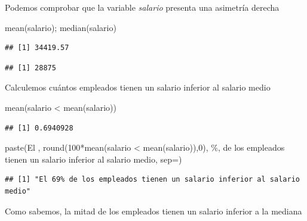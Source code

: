 \documentclass[
]{book}
\newenvironment{Shaded}{\begin{snugshade}}{\end{snugshade}}
\newcommand{\AttributeTok}[1]{\textcolor[rgb]{0.77,0.63,0.00}{#1}}
\newcommand{\DecValTok}[1]{\textcolor[rgb]{0.00,0.00,0.81}{#1}}
\newcommand{\FunctionTok}[1]{\textcolor[rgb]{0.00,0.00,0.00}{#1}}
\newcommand{\NormalTok}[1]{#1}
\newcommand{\SpecialCharTok}[1]{\textcolor[rgb]{0.00,0.00,0.00}{#1}}
\newcommand{\StringTok}[1]{\textcolor[rgb]{0.31,0.60,0.02}{#1}}
\theoremstyle{break}
\theoremstyle{nonumberplain}
\begin{document}
Podemos comprobar que la variable \emph{salario} presenta una
asimetría derecha

\begin{Shaded}
\begin{Highlighting}[]
\FunctionTok{mean}\NormalTok{(salario); }\FunctionTok{median}\NormalTok{(salario)}
\end{Highlighting}
\end{Shaded}

\begin{verbatim}
## [1] 34419.57
\end{verbatim}

\begin{verbatim}
## [1] 28875
\end{verbatim}

Calculemos cuántos empleados tienen un salario inferior al salario medio

\begin{Shaded}
\begin{Highlighting}[]
\FunctionTok{mean}\NormalTok{(salario }\SpecialCharTok{\textless{}} \FunctionTok{mean}\NormalTok{(salario))}
\end{Highlighting}
\end{Shaded}

\begin{verbatim}
## [1] 0.6940928
\end{verbatim}

\begin{Shaded}
\begin{Highlighting}[]
\FunctionTok{paste}\NormalTok{(}\StringTok{\textquotesingle{}El \textquotesingle{}}\NormalTok{, }\FunctionTok{round}\NormalTok{(}\DecValTok{100}\SpecialCharTok{*}\FunctionTok{mean}\NormalTok{(salario }\SpecialCharTok{\textless{}} \FunctionTok{mean}\NormalTok{(salario)),}\DecValTok{0}\NormalTok{), }\StringTok{\textquotesingle{}\%\textquotesingle{}}\NormalTok{,}
      \StringTok{\textquotesingle{} de los empleados tienen un salario inferior al salario medio\textquotesingle{}}\NormalTok{, }\AttributeTok{sep=}\StringTok{\textquotesingle{}\textquotesingle{}}\NormalTok{)}
\end{Highlighting}
\end{Shaded}

\begin{verbatim}
## [1] "El 69% de los empleados tienen un salario inferior al salario medio"
\end{verbatim}

Como sabemos, la mitad de los empleados tienen un salario inferior a la mediana
\end{document}
